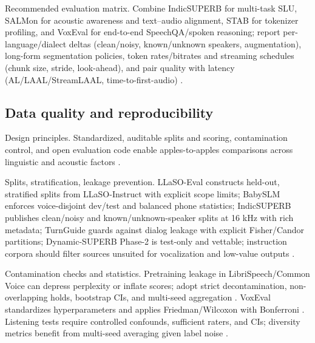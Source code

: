 \documentclass{article}
\begin{document}
Recommended evaluation matrix. Combine IndicSUPERB for multi-task SLU, SALMon for acoustic awareness and text--audio alignment, STAB for tokenizer profiling, and VoxEval for end-to-end SpeechQA/spoken reasoning; report per-language/dialect deltas (clean/noisy, known/unknown speakers, augmentation), long-form segmentation policies, token rates/bitrates and streaming schedules (chunk size, stride, look-ahead), and pair quality with latency (AL/LAAL/StreamLAAL, time-to-first-audio) \cite{entry2025indicsuperbspeechprocessinguniversalperf,maimon2025salmonsuiteacousticlanguagemodelevaluati,vashishth2024stabspeechtokenizerassessmentbenchmark,cui2025voxevalbenchmarkingknowledgeunderstandin,zhang2025impactframeratesspeechtokenizercasestudy}.

\subsection{Data quality and reproducibility} \label{subsec:Data quality and reproducibility}

Design principles. Standardized, auditable splits and scoring, contamination control, and open evaluation code enable apples-to-apples comparisons across linguistic and acoustic factors \cite{entry2025indicsuperbspeechprocessinguniversalperf,maimon2025salmonsuiteacousticlanguagemodelevaluati}.

Splits, stratification, leakage prevention. LLaSO-Eval constructs held-out, stratified splits from LLaSO-Instruct with explicit scope limits; BabySLM enforces voice-disjoint dev/test and balanced phone statistics; IndicSUPERB publishes clean/noisy and known/unknown-speaker splits at 16 kHz with rich metadata; TurnGuide guards against dialog leakage with explicit Fisher/Candor partitions; Dynamic-SUPERB Phase-2 is test-only and vettable; instruction corpora should filter sources unsuited for vocalization and low-value outputs \cite{sun2025llasofoundationalframeworkreproduciblere,lavechin2023babyslmlanguageacquisitionfriendlybenchm,cui2025thinkbeforeyoutalkenhancingmeaningfuldia,huang2025dynamicsuperbphase2collaborativelyexpand,shu2023llasmlargelanguagespeechmodel}.

Contamination checks and statistics. Pretraining leakage in LibriSpeech/Common Voice can depress perplexity or inflate scores; adopt strict decontamination, non-overlapping holds, bootstrap CIs, and multi-seed aggregation \cite{tseng2025evaluationllmsspeechisoftenflawedtestset}. VoxEval standardizes hyperparameters and applies Friedman/Wilcoxon with Bonferroni \cite{cui2025voxevalbenchmarkingknowledgeunderstandin}. Listening tests require controlled confounds, sufficient raters, and CIs; diversity metrics benefit from multi-seed averaging given label noise \cite{wang2024evaluatingtextspeechsynthesislargediscre,futeral2025madspeechmeasuresacousticdiversity}.
\end{document}
